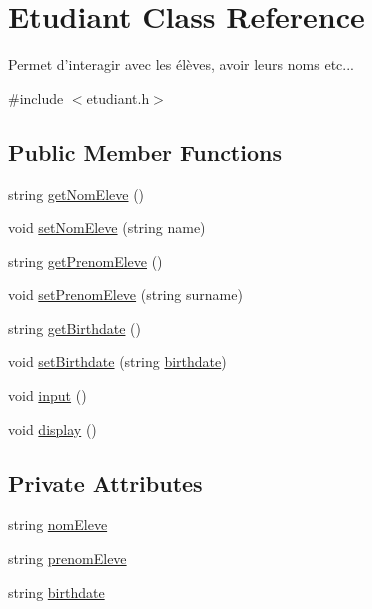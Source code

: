 \hypertarget{class_etudiant}{\section{Etudiant Class Reference}
\label{class_etudiant}
}


Permet d'interagir avec les élèves, avoir leurs noms etc...  




{\ttfamily \#include $<$etudiant.\+h$>$}

\subsection*{Public Member Functions}
\begin{DoxyCompactItemize}
\item 
string \hyperlink{class_etudiant_a7d66b4c276b26dd0123ce6c7eca43b2c}{get\+Nom\+Eleve} ()
\item 
void \hyperlink{class_etudiant_a82cabb4468a01fd846086c346881a771}{set\+Nom\+Eleve} (string name)
\item 
string \hyperlink{class_etudiant_adb8c0f54ba1eaafd0ed5932eb09b4675}{get\+Prenom\+Eleve} ()
\item 
void \hyperlink{class_etudiant_af2a6df92fe135086096c1bd47bedf36a}{set\+Prenom\+Eleve} (string surname)
\item 
string \hyperlink{class_etudiant_aae3d1c846e93bd3f97bfb459171436ab}{get\+Birthdate} ()
\item 
void \hyperlink{class_etudiant_a36a564b7f8caf6761cd7766a1182a38e}{set\+Birthdate} (string \hyperlink{class_etudiant_a23b0bd1afd7b7fb4f600e78d7ce4ebc7}{birthdate})
\item 
void \hyperlink{class_etudiant_a37433540e5c7b724de0964a5ecbbead8}{input} ()
\item 
void \hyperlink{class_etudiant_afb95ac0c74157e6065e1de603c54381c}{display} ()
\end{DoxyCompactItemize}
\subsection*{Private Attributes}
\begin{DoxyCompactItemize}
\item 
string \hyperlink{class_etudiant_a78c92cfe77639d58fe3d6597e4737d79}{nom\+Eleve}
\item 
string \hyperlink{class_etudiant_a484469a096eaddc8f432003b00ca2f54}{prenom\+Eleve}
\item 
string \hyperlink{class_etudiant_a23b0bd1afd7b7fb4f600e78d7ce4ebc7}{birthdate}
\end{DoxyCompactItemize}


